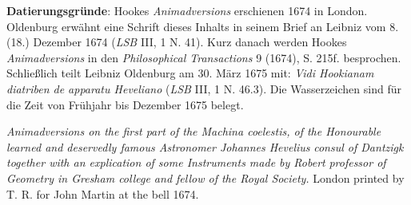\vspace*{5mm}
\begin{ledgroup}
\footnotesize 
\pstart
\noindent\footnotesize{\textbf{Datierungsgr\"{u}nde}: Hookes \textit{Animadversions} erschienen 1674 in London. Oldenburg erw\"{a}hnt eine Schrift dieses Inhalts in seinem Brief an Leibniz vom 8. (18.) Dezember 1674 (\textit{LSB} III, 1 N. 41). Kurz danach werden Hookes \textit{Animadversions} in den \textit{Philosophical Transactions} 9 (1674), S. 215f.\cite{00158} besprochen. Schlie{\ss}lich teilt Leibniz Oldenburg am 30. M\"{a}rz 1675 mit: \textit{Vidi Hookianam diatriben de apparatu Heveliano} (\textit{LSB} III, 1 N. 46.3). Die Wasserzeichen sind für die Zeit von Frühjahr bis Dezember 1675 belegt.}
\pend
\end{ledgroup}
\count{}
\count{}
\count{}
\vspace*{8mm}
\pstart 
\normalsize\noindent
[10~r\textsuperscript{o}]
\textit{Animadversions on the first part of the Machina coelestis, of the Honourable learned and deservedly famous Astronomer Johannes Hevelius\cite{00329}}\protect{} \textit{consul of Dantzigk}\protect{} \textit{together with an explication of some Instruments made by Robert}  \textit{professor of Geometry in Gresham college and fellow of the Royal Society.} London\protect{} printed by T. R. for John Martin\protect{} at the bell 1674. 
\pend 
